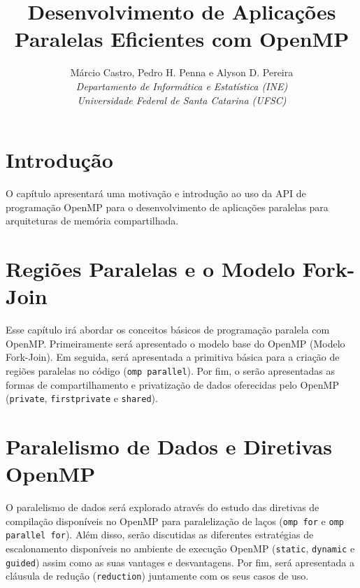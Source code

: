 \documentclass{SBCbookchapter}
\author{Márcio Castro, Pedro H. Penna e Alyson D. Pereira\\
\textit{Departamento de Informática e Estatística (INE)}\\
\textit{Universidade Federal de Santa Catarina (UFSC)}
}
\title{Desenvolvimento de Aplicações Paralelas Eficientes com OpenMP}
\begin{document}
\maketitle

\begin{abstract}
\end{abstract}




\section{Introdução}

O capítulo apresentará uma motivação e introdução ao uso da API de programação OpenMP para o desenvolvimento de aplicações paralelas para arquiteturas de memória compartilhada.

\section{Regiões Paralelas e o Modelo Fork-Join}

Esse capítulo irá abordar os conceitos básicos de programação paralela com OpenMP. Primeiramente será apresentado o modelo base do OpenMP (Modelo Fork-Join). Em seguida, será apresentada a primitiva básica para a criação de regiões paralelas no código (\texttt{omp parallel}). Por fim, o serão apresentadas as formas de compartilhamento e privatização de dados oferecidas pelo OpenMP (\texttt{private}, \texttt{firstprivate} e \texttt{shared}).

\section{Paralelismo de Dados e Diretivas OpenMP}

O paralelismo de dados será explorado através do estudo das diretivas de compilação disponíveis no OpenMP para paralelização de laços (\texttt{omp for} e \texttt{omp parallel for}). Além disso, serão discutidas as diferentes estratégias de escalonamento disponíveis no ambiente de execução OpenMP (\texttt{static}, \texttt{dynamic} e \texttt{guided}) assim como as suas vantages e desvantagens. Por fim, será apresentada a cláusula de redução (\texttt{reduction}) juntamente com os seus casos de uso.
\end{document}
